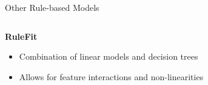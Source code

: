 \documentclass[11pt,compress,t,notes=noshow, aspectratio=169, xcolor=table]{beamer}
\begin{document}
\begin{frame}[c]{Other Rule-based Models}

\begin{columns}[c, totalwidth=\textwidth]
    \begin{column}{0.6\textwidth}
        \textbf{RuleFit} 
        \begin{itemize}
            \item Combination of linear models and decision trees 
            \item Allows for feature interactions and non-linearities
        \end{itemize}




\end{column}
\end{columns}
\end{frame}
\end{document}
